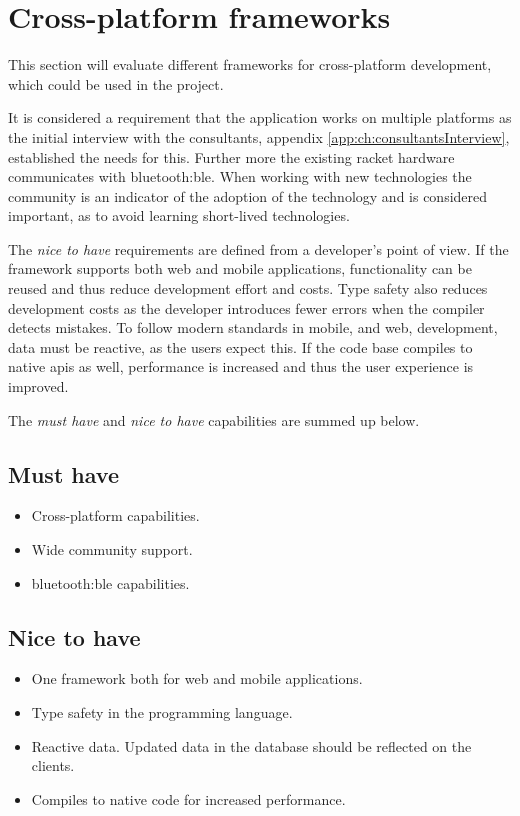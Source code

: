 \section{Cross-platform frameworks}
\label{sec:crossplatform}

This section will evaluate different frameworks for cross-platform development, which could be used in the project.

It is considered a requirement that the application works on multiple platforms as the initial interview with the consultants, appendix \ref{app:ch:consultantsInterview}, established the needs for this. Further more the existing racket hardware communicates with \gls{bluetooth:ble}.
When working with new technologies the community is an indicator of the adoption of the technology and is considered important, as to avoid learning short-lived technologies.

The \textit{nice to have} requirements are defined from a developer's point of view.
If the framework supports both web and mobile applications, functionality can be reused and thus reduce development effort and costs.
Type safety also reduces development costs as the developer introduces fewer errors when the compiler detects mistakes.
To follow modern standards in mobile, and web, development, data must be reactive, as the users expect this.
If the code base compiles to native \glspl{api} as well, performance is increased and thus the user experience is improved.

The \textit{must have} and \textit{nice to have} capabilities are summed up below.

\subsection*{Must have}
\begin{itemize}
	\item Cross-platform capabilities.
	\item Wide community support.
	\item \gls{bluetooth:ble} capabilities.
\end{itemize}

\subsection*{Nice to have}
\begin{itemize}
	\item One framework both for web and mobile applications.
	\item Type safety in the programming language.
	\item Reactive data. Updated data in the database should be reflected on the clients.
	\item Compiles to native code for increased performance.
\end{itemize}

